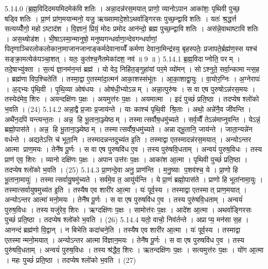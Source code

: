 5.14.0
(ब्र॒ह्म॒विदिदमयमिदमेक॑विशतिः । अन्ना॒दन्न॑रस॒मयात् प्राणो॒ व्यानोऽपान आका॑शः॒ पृथिवी पुच्छ॒ षड्विशतिः । प्रा॒णं प्रा॑ण॒मयान्मनो॒ यजु॒\ar{} ऋख्सामादे॒शोऽथर्वाङ्गिरसः पुच्छ॒न्द्वाविशतिः । यतः॑ श्र॒द्धर्त्त सत्यय्योँ॑गो॒ महोऽष्टाद॑श । वि॒ज्ञानं॒ प्रियं॒ मोदः प्रमोद आन॑न्दो॒ ब्रह्म पुच्छ॒न्द्वाविशतिः । अस॑न्ने॒वाथाष्टाविशतिः । अस॒थ्षोड॑श । भी॒षाऽस्मा॒न्मानुषो॒ मनुष्यगन्धर्वाणा॒न्देवगन्धर्वाणां॒ पितृणाञ्चिरलोकलोकाना॒माजानजानाङ्कर्मदेवानाय्येँ कर्मणा देवाना॒मिन्द्र॑स्य॒ बृहस्पतेः॒ प्रजापते॒र्ब्रह्म॑ण॒स्स यश्च॑ सङ्क्रा॒मत्येक॑पञ्चा॒शत् । यतः॒ कुत॑श्च॒नैतमेका॑दश॒ नव॑ ॥ 9 ॥ )
5.14.1
ब्र॒ह्म॒विदाप्नोति॒ परम् । तदे॒षाभ्यु॑क्ता । स॒त्यं ज्ञा॒नम॑न॒न्तं ब्रह्म॑ । यो वेद॒ निहि॑त॒ङ्गुहा॑यां पर॒मे व्यो॑मन् । सोऽश्नुते॒ सर्वा॒न्कामान्त्स॒ह । ब्रह्म॑णा विप॒श्चितेति॑ । तस्मा॒द्वा ए॒तस्मा॑दा॒त्मन॑ आका॒शस्संभू॑तः । आ॒का॒शाद्वा॒युः । वा॒योर॒ग्निः । अ॒ग्नेरापः॑ । अ॒द्भ्यः पृ॑थि॒वी । पृ॒थि॒व्या ओष॑धयः । ओष॑धी॒भ्योऽन्नम् । अन्ना॒त्पुरु॑षः । स वा एष पुरुषोऽन्न॑रस॒मयः । तस्येद॑मेव॒ शिरः । अयन्दक्षि॑णः प॒क्षः । अयमुत्त॑रः प॒क्षः । अयमात्मा । इदं पुच्छं॑ प्रति॒ष्ठा । तदप्येष श्लो॑को भ॒वति । (24)
5.14.2
अन्ना॒द्वै प्र॒जाः प्र॒जाय॑न्ते । याः काश्च॑ पृथि॒वी श्रि॒ताः । अथो॒ अन्ने॑नै॒व जी॑वन्ति । अथै॑न॒दपि॑ यन्त्यन्त॒तः । अन्न॒ हि भू॒ताना॒ञ्ज्येष्ठम् । तस्मात्सर्वौष॒धमु॑च्यते । सर्व॒व्वैँ तेऽन्न॑माप्नुवन्ति । येऽन्नं॒ ब्रह्मो॒पास॑ते । अन्न॒ हि भू॒ताना॒ञ्ज्येष्ठम् । तस्मात्सर्वौष॒धमु॑च्यते । अन्नाद्भू॒तानि॒ जाय॑न्ते । जाता॒न्यन्ने॑न वर्धन्ते । अद्यतेऽत्ति च॑ भूता॒नि । तस्मादन्नन्तदुच्य॑त इ॒ति । तस्माद्वा एतस्मादन्न॑रस॒मयात् । अन्योऽन्तर आत्मा प्राण॒मयः । तेनै॑ष पू॒र्णः । स वा एष पुरुषवि॑ध ए॒व । तस्य पुरु॑षवि॒धताम् । अन्वयं॑ पुरुष॒विधः । तस्य प्राण॑ एव॒ शिरः । व्यानो दक्षि॑णः प॒क्षः । अपान उत्त॑रः प॒क्षः । आका॑श आ॒त्मा । पृथिवी पुच्छं॑ प्रति॒ष्ठा । तदप्येष श्लो॑को भ॒वति । (25)
5.14.3
प्रा॒णन्दे॒वा अनु॒ प्राण॑न्ति । म॒नु॒ष्याः प॒शव॑श्च॒ ये । प्रा॒णो हि भू॒ताना॒मायुः॑ । तस्मात्सर्वायु॒षमु॑च्यते । सर्व॑मे॒व त॒ आयु॑र्यन्ति । ये प्रा॒णं ब्रह्मो॒पास॑ते । प्राणो हि भूता॑नामा॒युः । तस्मात्सर्वायुषमुच्य॑त इ॒ति । तस्यैष एव शारी॑र आ॒त्मा । यः॑ पूर्व॒स्य । तस्माद्वा एतस्मात् प्राण॒मयात् । अन्योऽन्तर आत्मा॑ मनो॒मयः । तेनै॑ष पू॒र्णः । स वा एष पुरुषवि॑ध ए॒व । तस्य पुरु॑षवि॒धताम् । अन्वयं॑ पुरुष॒विधः । तस्य यजु॑रेव॒ शिरः । ऋग्दक्षि॑णः प॒क्षः । सामोत्त॑रः प॒क्षः । आदे॑श आ॒त्मा । अथर्वाङ्गिरसः पुच्छं॑ प्रति॒ष्ठा । तदप्येष श्लो॑को भ॒वति । (26)
5.14.4
यतो॒ वाचो॒ निव॑र्तन्ते । अप्राप्य॒ मन॑सा स॒ह । आनन्दं ब्रह्म॑णो वि॒द्वान् । न बिभेति कदा॑चने॒ति । तस्यैष एव शारी॑र आ॒त्मा । यः॑ पूर्व॒स्य । तस्माद्वा एतस्मान्मनो॒मयात् । अन्योऽन्तर आत्मा वि॑ज्ञान॒मयः । तेनै॑ष पू॒र्णः । स वा एष पुरुषवि॑ध ए॒व । तस्य पुरु॑षवि॒धताम् । अन्वयं॑ पुरुष॒विधः । तस्य श्र॑द्धैव॒ शिरः । ऋतन्दक्षि॑णः प॒क्षः । सत्यमुत्त॑रः प॒क्षः । यो॑ग आ॒त्मा । महः पुच्छं॑ प्रति॒ष्ठा । तदप्येष श्लो॑को भ॒वति । (27)
